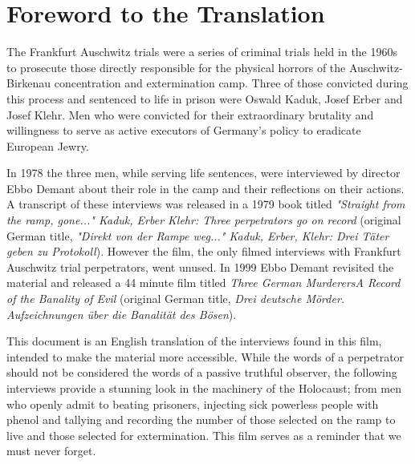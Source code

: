 \documentclass{article}
\title{\titlepartone \newline \titleparttwo}
\author{Directed by Ebbo Demant \\
    \small{Translated from the original German by Jack Borer}
}
\date{} %
\newcommand{\titlepartone}{Three German Murderers}
\newcommand{\titleparttwo}{A Record of the Banality of Evil}
\begin{document}
\maketitle

\section*{Foreword to the Translation}


The Frankfurt Auschwitz trials were a series of criminal trials held in the 1960s to prosecute those directly responsible for the physical horrors of the Auschwitz-Birkenau concentration and extermination camp. Three of those convicted during this process and sentenced to life in prison were Oswald Kaduk, Josef Erber and Josef Klehr. Men who were convicted for their extraordinary brutality and willingness to serve as active executors of Germany's policy to eradicate European Jewry.

In 1978 the three men, while serving life sentences, were interviewed by director Ebbo Demant about their role in the camp and their reflections on their actions. A transcript of these interviews was released in a 1979 book titled \textit{"Straight from the ramp, gone..." Kaduk, Erber Klehr: Three perpetrators go on record} (original German title, \textit{"Direkt von der Rampe weg..." Kaduk, Erber, Klehr: Drei Täter geben zu Protokoll})\cite{DirektVonDerRampeWeg}. However the film, the only filmed interviews with Frankfurt Auschwitz trial perpetrators, went unused. In 1999 Ebbo Demant revisited the material and released a 44 minute film titled \textit{\titlepartone \space \titleparttwo} (original German title, \textit{Drei deutsche Mörder. Aufzeichnungen über die Banalität des Bösen})\cite{DreiDeutscheMörder}. 

This document is an English translation of the interviews found in this film, intended to make the material more accessible. While the words of a perpetrator should not be considered the words of a passive truthful observer, the following interviews provide a stunning look in the machinery of the Holocaust; from men who openly admit to beating prisoners, injecting sick powerless people with phenol and tallying and recording the number of those selected on the ramp to live and those selected for extermination. This film serves as a reminder that we must never forget.

\newpage
\end{document}

